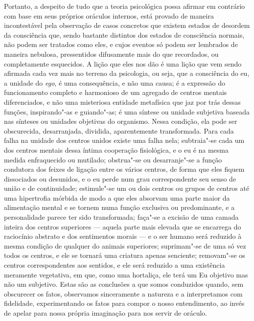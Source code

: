 Portanto, a despeito de tudo que a teoria psicológica possa afirmar em
contrário com base em seus próprios oráculos internos, está provado de
maneira incontestável pela observação de casos concretos que existem 
estados de desordem da consciência que, sendo bastante distintos dos
estados de consciência normais, não podem ser tratados como eles, e
cujos eventos só podem ser lembrados de maneira nebulosa, pressentidos
difusamente mais do que recordados, ou completamente esquecidos.  A
lição que eles nos dão é uma lição que vem sendo afirmada cada vez mais
no terreno da psicologia, ou seja, que a consciência do eu, a
unidade do \textit{ego}, é uma consequência, e não uma causa; é a
expressão do funcionamento completo e harmonioso de um agregado de
centros mentais diferenciados, e não uma misteriosa entidade metafísica
que jaz por trás dessas funções, inspirando"-as e guiando"-as; é uma
síntese ou unidade subjetiva baseada nas sínteses ou unidades objetivas
do organismo. Nessa condição, ela pode ser obscurecida, desarranjada,
dividida, aparentemente transformada.  Para cada falha na unidade dos
centros unidos existe uma falha nela; subtraia"-se cada um dos centros
mentais dessa íntima cooperação fisiológica, e o eu é na mesma medida
enfraquecido ou mutilado; obstrua"-se ou desarranje"-se a função
condutora dos feixes de ligação entre os vários centros, de forma que
eles fiquem dissociados ou desunidos, e o eu perde num grau
correspondente seu senso de união e de continuidade; estimule"-se um ou
dois centros ou grupos de centros até uma hipertrofia mórbida de modo a
que eles absorvam uma parte maior da alimentação mental e se tornem
numa função exclusiva ou predominante, e a personalidade parece ter
sido transformada; faça"-se a excisão de uma camada inteira dos centros
superiores --- aquela parte mais elevada que se encarrega do raciocínio
abstrato e dos sentimentos morais --- e o ser humano será reduzido à
mesma condição de qualquer do animais superiores; suprimam"-se de uma só
vez todos os centros, e ele se tornará uma criatura apenas senciente;
removam"-se os centros correspondentes aos sentidos, e ele será reduzido
a uma existência meramente vegetativa, em que, como uma hortaliça, ele
terá um Eu objetivo mas não um subjetivo. Estas são as conclusões a que
somos conduzidos quando, sem obscurecer os fatos, observamos
sinceramente a natureza e a interpretamos com fidelidade,
experimentando os fatos para compor o nosso entendimento, ao invés de
apelar para nossa própria imaginação para nos servir de oráculo. 





